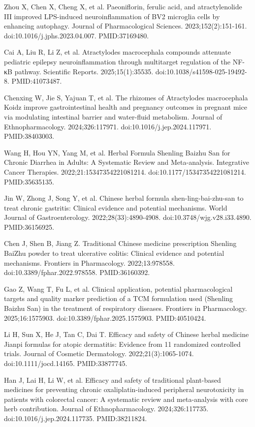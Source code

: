 \documentclass[12pt,oneside]{book}
\newcommand{\reff}[2]{\par\hangindent=7mm\hangafter=1\noindent[#1]\hspace{2mm}#2\par}
\begin{document}
\reff{30}{Zhou X, Chen X, Cheng X, et al. Paeoniflorin, ferulic acid, and atractylenolide III improved LPS-induced neuroinflammation of BV2 microglia cells by enhancing autophagy. Journal of Pharmacological Sciences. 2023;152(2):151-161. doi:10.1016/j.jphs.2023.04.007. PMID:37169480.}

\reff{31}{Cai A, Liu R, Li Z, et al. Atractylodes macrocephala compounds attenuate pediatric epilepsy neuroinflammation through multitarget regulation of the NF-κB pathway. Scientific Reports. 2025;15(1):35535. doi:10.1038/s41598-025-19492-8. PMID:41073487.}

\reff{32}{Chenxing W, Jie S, Yajuan T, et al. The rhizomes of Atractylodes macrocephala Koidz improve gastrointestinal health and pregnancy outcomes in pregnant mice via modulating intestinal barrier and water-fluid metabolism. Journal of Ethnopharmacology. 2024;326:117971. doi:10.1016/j.jep.2024.117971. PMID:38403003.}

\reff{33}{Wang H, Hou YN, Yang M, et al. Herbal Formula Shenling Baizhu San for Chronic Diarrhea in Adults: A Systematic Review and Meta-analysis. Integrative Cancer Therapies. 2022;21:15347354221081214. doi:10.1177/15347354221081214. PMID:35635135.}

\reff{34}{Jin W, Zhong J, Song Y, et al. Chinese herbal formula shen-ling-bai-zhu-san to treat chronic gastritis: Clinical evidence and potential mechanisms. World Journal of Gastroenterology. 2022;28(33):4890-4908. doi:10.3748/wjg.v28.i33.4890. PMID:36156925.}

\reff{35}{Chen J, Shen B, Jiang Z. Traditional Chinese medicine prescription Shenling BaiZhu powder to treat ulcerative colitis: Clinical evidence and potential mechanisms. Frontiers in Pharmacology. 2022;13:978558. doi:10.3389/fphar.2022.978558. PMID:36160392.}

\reff{36}{Gao Z, Wang T, Fu L, et al. Clinical application, potential pharmacological targets and quality marker prediction of a TCM formulation used (Shenling Baizhu San) in the treatment of respiratory diseases. Frontiers in Pharmacology. 2025;16:1575903. doi:10.3389/fphar.2025.1575903. PMID:40510424.}

\reff{37}{Li H, Sun X, He J, Tan C, Dai T. Efficacy and safety of Chinese herbal medicine Jianpi formulas for atopic dermatitis: Evidence from 11 randomized controlled trials. Journal of Cosmetic Dermatology. 2022;21(3):1065-1074. doi:10.1111/jocd.14165. PMID:33877745.}

\reff{38}{Han J, Lai H, Li W, et al. Efficacy and safety of traditional plant-based medicines for preventing chronic oxaliplatin-induced peripheral neurotoxicity in patients with colorectal cancer: A systematic review and meta-analysis with core herb contribution. Journal of Ethnopharmacology. 2024;326:117735. doi:10.1016/j.jep.2024.117735. PMID:38211824.}
\end{document}
